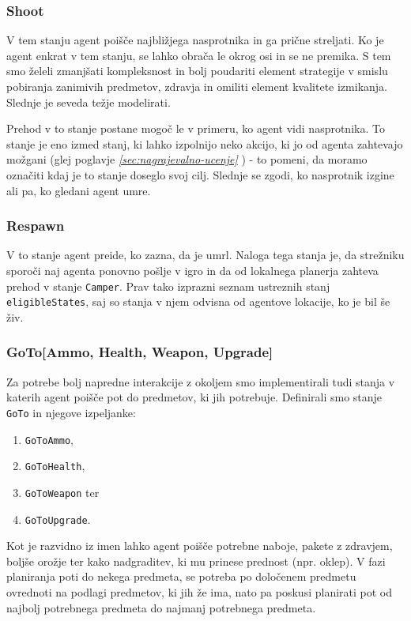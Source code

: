 \documentclass[a4paper,10pt]{article}
\begin{document}
\subsubsection{Shoot}
V tem stanju agent poišče najbližjega nasprotnika in ga prične streljati. Ko je agent enkrat v tem stanju, se lahko obrača le okrog osi in se ne premika. 
S tem smo želeli zmanjšati kompleksnost in bolj poudariti element strategije v smislu pobiranja zanimivih predmetov, zdravja in omiliti element kvalitete 
izmikanja. Slednje je seveda težje modelirati.

Prehod v to stanje postane mogoč le v primeru, ko agent vidi nasprotnika. To stanje je eno izmed stanj, ki lahko izpolnijo neko akcijo, ki jo od agenta zahtevajo možgani (glej poglavje \textit{\ref{sec:nagrajevalno-ucenje} }) - to pomeni, da moramo označiti kdaj je to stanje doseglo svoj cilj. Slednje se zgodi, ko nasprotnik izgine ali pa, ko gledani agent umre.
\subsubsection{Respawn}
V to stanje agent preide, ko zazna, da je umrl. Naloga tega stanja je, da strežniku sporoči naj agenta ponovno pošlje v igro in da od lokalnega planerja zahteva prehod v stanje \verb+Camper+. Prav tako izprazni seznam ustreznih stanj \verb+eligibleStates+, saj so stanja v njem odvisna od agentove lokacije, ko je bil še živ.
\subsubsection{GoTo[Ammo, Health, Weapon, Upgrade]}

Za potrebe bolj napredne interakcije z okoljem smo implementirali tudi stanja v katerih agent poišče pot do predmetov, ki jih potrebuje.
Definirali smo stanje \verb+GoTo+ in njegove izpeljanke:

\begin{enumerate}
 \item \verb+GoToAmmo+,
 \item \verb+GoToHealth+,
 \item \verb+GoToWeapon+ ter
 \item \verb+GoToUpgrade+.
\end{enumerate}

Kot je razvidno iz imen lahko agent poišče potrebne naboje, pakete z zdravjem, boljše orožje ter kako nadgraditev, ki mu prinese prednost (npr. oklep). V fazi planiranja poti do nekega predmeta, se potreba po določenem predmetu ovrednoti na podlagi predmetov, ki jih že ima, nato pa poskusi planirati pot od najbolj potrebnega predmeta do najmanj potrebnega predmeta.
\end{document}
